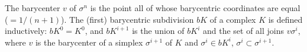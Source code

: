 The barycenter $v$ of $\sigma^n$ is the point all of whose barycentric coordinates are equal ($= 1/(n+1)$). The (first) barycentric subdivision $bK$ of a complex $K$ is defined inductively: $bK^0 = K^0$, and $bK^{i+1}$ is the union of $bK^i$ and the set of all joins $v\sigma^i$, where $v$ is the barycenter of a simplex $\sigma^{i+1}$ of $K$ and $\sigma^i \in bK^i$, $\sigma^i \subset \sigma^{i+1}$.
